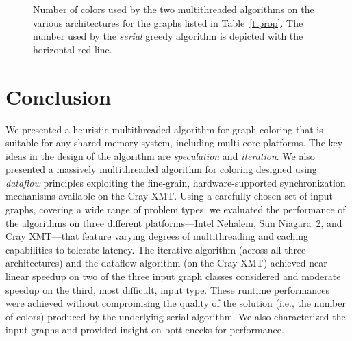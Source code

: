 \documentclass{article}
\begin{document}
\begin{figure}
\centering
{}
\caption{\small Number of colors used by the two multithreaded algorithms on the various 
architectures for the graphs listed in Table~\ref{t:prop}. 
The number used by the {\em serial} greedy algorithm is depicted with the horizontal red line.}
\label{f:all-colors}
\end{figure}

\section{Conclusion}
\label{sec:conc}

We presented a heuristic multithreaded algorithm for graph coloring 
that is suitable for any shared-memory system, including multi-core platforms.
The key ideas in the design of the algorithm are {\em speculation} and {\em iteration}.  
We also presented a massively multithreaded algorithm for coloring designed using
{\em dataflow} principles exploiting the fine-grain, hardware-supported 
synchronization mechanisms available on the Cray XMT. 
Using a carefully chosen set of input graphs, covering a wide range of problem types, 
we evaluated the performance of the algorithms on three different platforms---Intel Nehalem, 
Sun Niagara~2, and Cray XMT---that feature varying degrees of 
multithreading and caching capabilities to tolerate latency.
The iterative algorithm (across all three architectures) and 
the dataflow algorithm (on the Cray XMT)
achieved near-linear speedup on two of the three input graph classes considered and 
moderate speedup on the third, most difficult, input type.  
These runtime performances were achieved without compromising the quality of the solution
(i.e., the number of colors) produced by the underlying serial algorithm.
We also characterized the input graphs and provided insight on bottlenecks for performance. 
\end{document}
